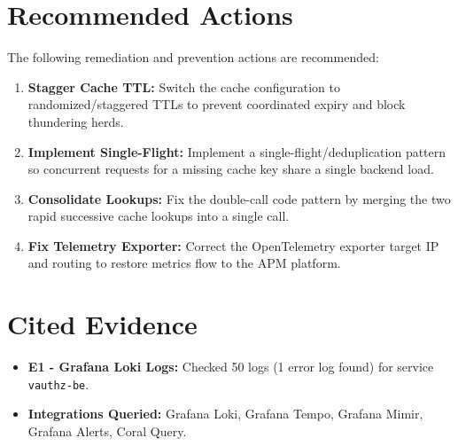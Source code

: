 \documentclass[10pt,a4paper]{article}
\begin{document}
\vspace{5pt}

\section{Recommended Actions}
The following remediation and prevention actions are recommended:
\begin{enumerate}[leftmargin=1.5em, itemsep=2pt]
    \item \textbf{Stagger Cache TTL:} Switch the cache configuration to randomized/staggered TTLs to prevent coordinated expiry and block thundering herds.
    \item \textbf{Implement Single-Flight:} Implement a single-flight/deduplication pattern so concurrent requests for a missing cache key share a single backend load.
    \item \textbf{Consolidate Lookups:} Fix the double-call code pattern by merging the two rapid successive cache lookups into a single call.
    \item \textbf{Fix Telemetry Exporter:} Correct the OpenTelemetry exporter target IP and routing to restore metrics flow to the APM platform.
\end{enumerate}

\vspace{5pt}

\section{Cited Evidence}
\begin{itemize}[leftmargin=1.5em, itemsep=1pt]
    \item \textbf{E1 - Grafana Loki Logs:} Checked 50 logs (1 error log found) for service \texttt{vauthz-be}.
    \item \textbf{Integrations Queried:} Grafana Loki, Grafana Tempo, Grafana Mimir, Grafana Alerts, Coral Query.
\end{itemize}
\end{document}
